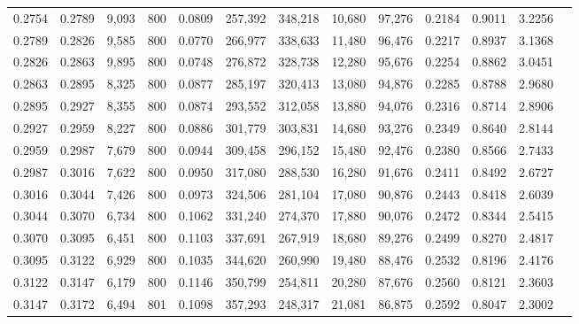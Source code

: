 \begin{tabular}{rrrrrrrrrrrrr}
0.2754 & 0.2789 &  9,093 &   800 &                                     0.0809 & 257,392 & 348,218 &  10,680 &  97,276 & 0.2184 & 0.9011 & 3.2256 \\
0.2789 & 0.2826 &  9,585 &   800 &                                     0.0770 & 266,977 & 338,633 &  11,480 &  96,476 & 0.2217 & 0.8937 & 3.1368 \\
0.2826 & 0.2863 &  9,895 &   800 &                                     0.0748 & 276,872 & 328,738 &  12,280 &  95,676 & 0.2254 & 0.8862 & 3.0451 \\
0.2863 & 0.2895 &  8,325 &   800 &                                     0.0877 & 285,197 & 320,413 &  13,080 &  94,876 & 0.2285 & 0.8788 & 2.9680 \\
0.2895 & 0.2927 &  8,355 &   800 &                                     0.0874 & 293,552 & 312,058 &  13,880 &  94,076 & 0.2316 & 0.8714 & 2.8906 \\
0.2927 & 0.2959 &  8,227 &   800 &                                     0.0886 & 301,779 & 303,831 &  14,680 &  93,276 & 0.2349 & 0.8640 & 2.8144 \\
0.2959 & 0.2987 &  7,679 &   800 &                                     0.0944 & 309,458 & 296,152 &  15,480 &  92,476 & 0.2380 & 0.8566 & 2.7433 \\
0.2987 & 0.3016 &  7,622 &   800 &                                     0.0950 & 317,080 & 288,530 &  16,280 &  91,676 & 0.2411 & 0.8492 & 2.6727 \\
0.3016 & 0.3044 &  7,426 &   800 &                                     0.0973 & 324,506 & 281,104 &  17,080 &  90,876 & 0.2443 & 0.8418 & 2.6039 \\
0.3044 & 0.3070 &  6,734 &   800 &                                     0.1062 & 331,240 & 274,370 &  17,880 &  90,076 & 0.2472 & 0.8344 & 2.5415 \\
0.3070 & 0.3095 &  6,451 &   800 &                                     0.1103 & 337,691 & 267,919 &  18,680 &  89,276 & 0.2499 & 0.8270 & 2.4817 \\
0.3095 & 0.3122 &  6,929 &   800 &                                     0.1035 & 344,620 & 260,990 &  19,480 &  88,476 & 0.2532 & 0.8196 & 2.4176 \\
0.3122 & 0.3147 &  6,179 &   800 &                                     0.1146 & 350,799 & 254,811 &  20,280 &  87,676 & 0.2560 & 0.8121 & 2.3603 \\
0.3147 & 0.3172 &  6,494 &   801 &                                     0.1098 & 357,293 & 248,317 &  21,081 &  86,875 & 0.2592 & 0.8047 & 2.3002 \\

\end{tabular}
